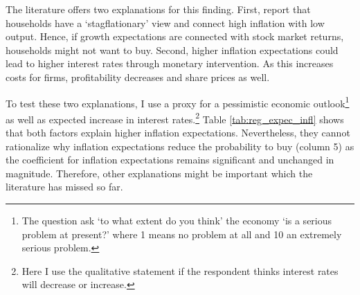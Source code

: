 \documentclass[ProjectABM]{subfiles}
\begin{document}








The literature offers two explanations for this finding. First, \cite{CCG_2020_inflation_communication} report that households have a `stagflationary' view and connect high inflation with low output. Hence, if growth expectations are connected with stock market returns, households might not want to buy. Second, higher inflation expectations could lead to higher interest rates through monetary intervention. As this increases costs for firms, profitability decreases and share prices as well. 

To test these two explanations, I use a proxy for a pessimistic economic outlook\footnote{The question ask `to what extent do you think' the economy `is a serious problem at present?' where 1 means no problem at all and 10 an extremely serious problem.} as well as expected increase in interest rates.\footnote{Here I use the qualitative statement if the respondent thinks interest rates will decrease or increase.} Table \ref{tab:reg_expec_infl} shows that both factors explain higher inflation expectations. Nevertheless, they cannot rationalize why inflation expectations reduce the probability to buy (column 5) as the coefficient for inflation expectations remains significant and unchanged in magnitude. Therefore, other explanations might be important which the literature has missed so far.

\end{document}
